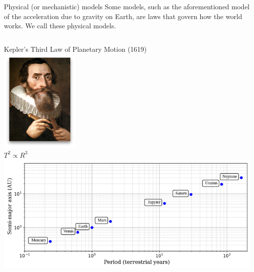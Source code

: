 \documentclass[aspectratio=169]{../latex_main/tntbeamer}  %
\begin{document}
	\begin{frame}{Physical (or mechanistic) models}
	    Some models, such as the aforementioned model of the acceleration due to gravity on Earth, are laws that govern how the world works. We call these physical models.\\
	    \bigskip
	    \begin{columns}
	        \begin{column}{.5\textwidth}
	                Kepler's Third Law of Planetary Motion (1619)\\
	                \hspace{1cm}     \includegraphics[scale=.5]{Bild8} \\  
	                \vspace{-1.3cm}  
	                \hspace{2.5cm} $T^2 \propto R^3$\\
	                \vspace{1.1cm}
	                \includegraphics[scale=.5]{Bild9}
	        \end{column}
	        
	        
	        

\end{columns}
\end{frame}
\end{document}
